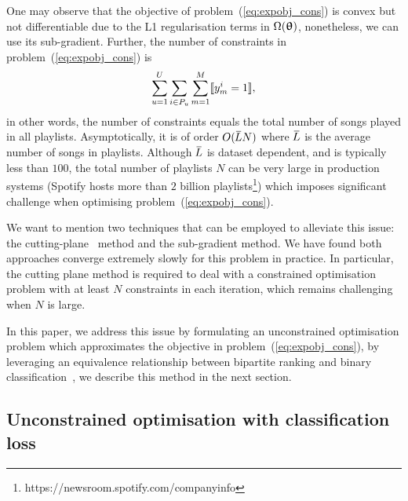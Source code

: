 One may observe that the objective of problem~(\ref{eq:expobj_cons}) is convex but not differentiable due to 
the L1 regularisation terms in $\Omega({\bm{\uptheta}})$, nonetheless, we can use its sub-gradient.
Further, the number of constraints in problem~(\ref{eq:expobj_cons}) is
$$
\sum_{u=1}^U \sum_{i \in P_u} \sum_{m=1}^M \llbracket y_m^i = 1 \rrbracket,
$$
in other words, the number of constraints equals the total number of songs played in all playlists.
Asymptotically, it is of order $O(\widebar{L} N)$ where $\widebar{L}$ is the average number of songs in playlists.
Although $\widebar{L}$ is dataset dependent, and is typically less than $100$,
the total number of playlists $N$ can be very large in production systems 
(\eg Spotify hosts more than $2$ billion playlists\footnote{https://newsroom.spotify.com/companyinfo})
which imposes significant challenge when optimising problem~(\ref{eq:expobj_cons}).

We want to mention two techniques that can be employed to alleviate this issue:
the cutting-plane~\cite{avriel2003nonlinear} method and the sub-gradient method.
We have found both approaches converge extremely slowly for this problem in practice.
In particular, the cutting plane method is required to deal with a constrained optimisation problem 
with at least $N$ constraints in each iteration, which remains challenging when $N$ is large.

In this paper, we address this issue by formulating an unconstrained optimisation problem which approximates 
the objective in problem~(\ref{eq:expobj_cons}), by leveraging an equivalence relationship between bipartite 
ranking and binary classification~\cite{ertekin2011equivalence}, we describe this method in the next section.




\subsection{Unconstrained optimisation with classification loss}

